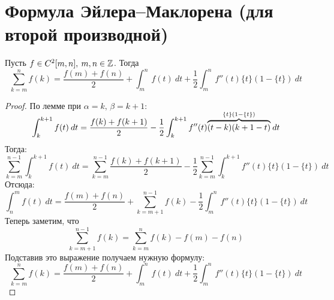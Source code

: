 \section{Формула Эйлера–Маклорена (для второй производной)}

\begin{theorem}
    Пусть $f \in C^2[m, n], \: m,n \in \mathbb{Z}$. Тогда
    \begin{equation*}
        \sum\limits_{k = m}^{n} f(k) = \frac{f(m) + f(n)}{2} +
        \int_{{m}}^{{n}} {f(t)} \: d{t} + \frac{1}{2}
        \int_{{m}}^{{n}} {f''(t)\{t\}(1 - \{t\})} \: d{t}
    \end{equation*}
\end{theorem}
\begin{proof}
  По лемме при $\alpha = k,\, \beta = k + 1$:
  \begin{equation*}
    \int_{{k}}^{{k + 1}} {f(t)} \: d{t} = \frac{f(k) + f(k + 1)}{2} -
    \frac{1}{2} \int_{{k}}^{{k + 1}} {f''(t)
    \smash{\overbrace{(t - k)(k + 1 - t)}^{\mathclap{\{t\}(1 - \{t\})}}}} \: d{t} {}
  \end{equation*}
  Тогда:
  \begin{equation*}
    \sum_{k = m}^{n - 1} \int_{{k}}^{{k + 1}} {f(t)} \: d{t} =
    \sum_{k = m}^{n - 1} \frac{f(k) + f(k + 1)}{2} -
    \frac{1}{2} \sum_{k = m}^{n - 1} \int_{{k}}^{{k + 1}}
    {f''(t)\{t\}(1 - \{t\})} \: d{t}
  \end{equation*}
  Отсюда:
  \begin{equation*}
    \int_{{n}}^{{m}} {f(t)} \: d{t} = \frac{f(m) + f(n)}{2} +
    \sum_{k = {m + 1}}^{n - 1} f(k) -
    \frac{1}{2} \int_{{m}}^{{n}} {f''(t)\{t\}(1 - \{t\})} \: d{t}
  \end{equation*}
  Теперь заметим, что
  \begin{equation*}
    \sum\limits_{k = m + 1}^{n - 1} f(k)
    = \sum\limits_{k = m}^{n} f(k) - f(m) - f(n)
  \end{equation*}
  Подставив это выражение получаем нужную формулу:
  \begin{equation*}
    \sum\limits_{k = m}^{n} f(k) = \frac{f(m) + f(n)}{2} +
    \int_{{m}}^{{n}} {f(t)} \: d{t} + \frac{1}{2}
    \int_{{m}}^{{n}} {f''(t)\{t\}(1 - \{t\})} \: d{t}
  \end{equation*}
\end{proof}